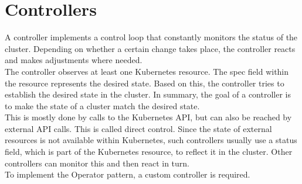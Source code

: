 \section{Controllers}\label{sec:controllers}
A controller implements a control loop that constantly monitors the status of the cluster.
Depending on whether a certain change takes place, the controller reacts and makes adjustments where needed.
\\
The controller observes at least one Kubernetes resource.
The spec field within the resource represents the desired state.
Based on this, the controller tries to establish the desired state in the cluster.
In summary, the goal of a controller is to make the state of a cluster match the desired state.
\\
This is mostly done by calls to the Kubernetes API, but can also be reached by external API calls. This is called direct control.
Since the state of external resources is not available within Kubernetes, such controllers usually use a status field, which is part of the Kubernetes resource, to reflect it in the cluster.
Other controllers can monitor this and then react in turn.
\\
To implement the Operator pattern, a custom controller is required.
~\cite{KUBERNETES-CONTROLLERS}